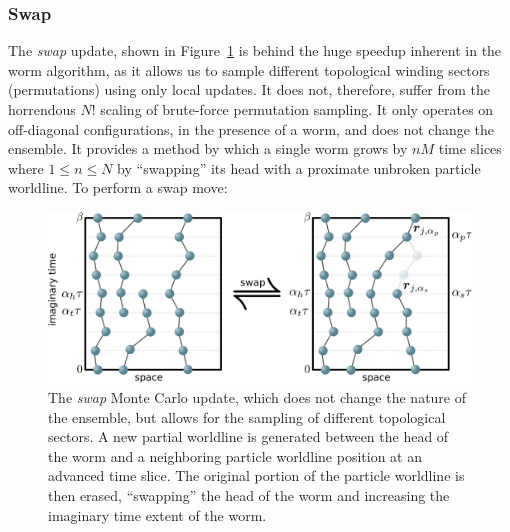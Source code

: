\documentclass[prb,aps,amssym,nofootinbib,floatfix,notitlepage]{revtex4-1}
\begin{document}
\subsubsection{Swap}
The \emph{swap} update, shown in Figure~\ref{fig:swap} is behind the huge
speedup inherent in the worm algorithm, as it allows us to sample different
topological winding sectors (permutations) using only local updates.  It does
not, therefore, suffer from the horrendous $N!$ scaling of brute-force
permutation sampling. It only operates on off-diagonal configurations, in the
presence of a worm, and does not change the ensemble. It provides a method by
which a single worm grows by $n M$ time slices where $1 \le n \le N$ by
``swapping'' its head with a proximate unbroken particle worldline.  To
perform a swap move:
%
\begin{figure}
\begin{center}
\includegraphics[width=0.70\columnwidth]{Figures/swap.pdf}
\end{center}
\caption{The \emph{swap} Monte Carlo update, which does not change the nature
of the ensemble, but allows for the sampling of different topological sectors.
A new partial worldline is generated between the head of the worm and a
neighboring particle worldline position at an advanced time slice.  The
original portion of the particle worldline is then erased, ``swapping'' the
head of the worm and increasing the imaginary time extent of the worm.}
\label{fig:swap}
 \end{figure}
%
\end{document}
